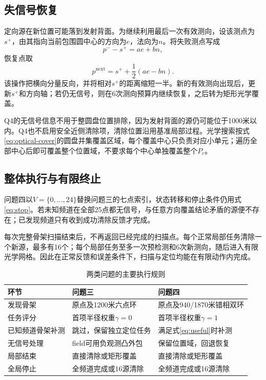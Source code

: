 \documentclass[UTF8,fontset=fandol,a4paper,zihao=-4]{ctexart}
\begin{document}
\subsection{失信号恢复}
定向源在新位置可能落到发射背面。为继续利用最后一次有效测向，设该测点为$s^+$，由其指向当前包围圆中心的方向为$e$，法向为$n$。将失败测点写成
\[
p^--s^+=a e+b n,
\]
恢复点取
\begin{equation}\label{eq:recovery}
p^{\mathrm{next}}=s^++\frac12(ae-bn).
\end{equation}
该操作把横向分量反向，并将相对$s^+$的距离缩短一半。新的有效测向出现后，更新$s^+$和方向轴；若仍无信号，则在6次测向预算内继续恢复，之后转为矩形光学覆盖。

Q4的无信号信息不用于整圆盘位置排除，因为发射背面的源仍可能位于1000米以内。Q4也不启用安全近侧清除项，清除位置沿用基准局部过程。光学搜索按式\eqref{eq:optical-cover}的圆盘并集覆盖区域，每个覆盖中心只负责对应小单元；遍历全部中心后即可覆盖整个位置域，不要求每个中心单独覆盖整个$P_c$。

\subsection{整体执行与有限终止}
问题四以$V=\{0,\ldots,24\}$替换问题三的七点索引，状态转移和停止条件仍用式\eqref{eq:stop}。若未知频道在全部25点都无信号，与任意方向覆盖结论矛盾的源便不存在；已发现频道只有收到成功清除反馈才完成。

每次完整骨架扫描结束后，不再返回已经完成的扫描点。每个正常局部任务清除一个新源，最多有16个；每个局部任务至多一次预检测和6次新测向，随后进入有限光学网格。因此在正常反馈和误差条件下，扫描与定位均能在有限动作内完成。

\begin{table}[H]\centering\small
\caption{两类问题的主要执行规则}
\begin{tabular}{p{3cm}p{5.1cm}p{5.1cm}}\toprule
环节 & 问题三 & 问题四\\\midrule
发现骨架 & 原点及1200米六点环 & 原点及940/1870米错相双环\\
任务评分 & 首项半径权重$\gamma=0$ & 首项半径权重$\gamma=1$\\
已知频道骨架补测 & 跳过，保留独立定位任务 & 满足式\eqref{eq:useful}时补测\\
无信号处理 & field可用负观测凸外包 & 保留位置域，回退恢复\\
局部结束 & 直接清除或矩形覆盖 & 直接清除或矩形覆盖\\
全局停止 & 全频道完成或16源清除 & 全频道完成或16源清除\\\bottomrule
\end{tabular}
\end{table}
\end{document}
